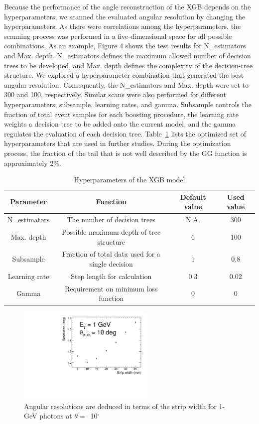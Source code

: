 \documentclass[preprint,12pt,times,a4paper]{elsarticle}
\begin{document}
Because the performance of the angle reconstruction of the XGB depends on the hyperparameters, we scanned the evaluated angular resolution by changing the hyperparameters. As there were correlations among the hyperparameters, the scanning process was performed in a five-dimensional space for all possible combinations. As an example, Figure 4 shows the test results for N\_estimators and Max. depth. N\_estimators defines the maximum allowed number of decision trees to be developed, and Max. depth defines the complexity of the decision-tree structure. We explored a hyperparameter combination that generated the best angular resolution. Consequently, the N\_estimators and Max. depth were set to 300 and 100, respectively. Similar scans were also performed for different hyperparameters, subsample, learning rates, and gamma. Subsample controls the fraction of total event samples for each boosting procedure, the learning rate weights a decision tree to be added onto the current model, and the gamma regulates the evaluation of each decision tree. Table~\ref{tab:XgbPar} lists the optimized set of hyperparameters that are used in further studies. During the optimization process, the fraction of the tail that is not well described by the GG function is approximately 2\%.

\begin{table}[hbt!]{\small
\centering
\caption{Hyperparameters of the XGB model}
\begin{tabular}{cccc}
\hline 
Parameter & Function & Default value & Used value \\ \hline 
N\_estimators & The number of decision trees & N.A. & 300 \\  
Max. depth & Possible maximum depth of tree structure & 6 & 100 \\ 
Subsample & Fraction of total data used for a single decision & 1 & 0.8 \\ 
Learning rate & Step length for calculation & 0.3 & 0.02 \\ 
Gamma & Requirement on minimum loss function & 0 & 0 \\ 
\hline
\end{tabular}
\label{tab:XgbPar}
}\end{table}

\begin{figure}[!hbt]
\centering
\includegraphics[width=0.58\textwidth]{figures/Fig5_width.pdf}
\caption{ Angular resolutions are deduced in terms of the strip width for 1-GeV photons at $\theta=$~10$^{\circ}$ }
\label{fig:angle_reco_width}
\end{figure}
\end{document}
